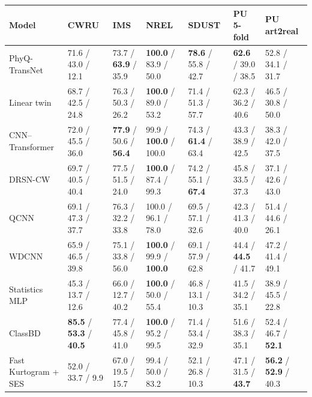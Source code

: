 \begin{tabular}{lllllll}
\toprule
Model & CWRU & IMS & NREL & SDUST & PU 5-fold & PU art2real \\
\midrule
PhyQ-TransNet & 71.6 / 43.0 / 12.1 & 73.7 / \textbf{63.9} / 35.9 & \textbf{100.0} / 83.9 / 50.0 & \textbf{78.6} / 55.8 / 42.7 & \textbf{62.6} / 39.0 / 38.5 & 52.8 / 34.1 / 31.7 \\
Linear twin & 68.7 / 42.5 / 24.8 & 76.3 / 50.3 / 26.2 & \textbf{100.0} / 89.0 / 53.2 & 71.4 / 51.3 / 57.7 & 62.3 / 36.2 / 40.6 & 46.5 / 30.8 / 50.0 \\
CNN--Transformer & 72.0 / 45.5 / 36.0 & \textbf{77.9} / 50.6 / \textbf{56.4} & 99.9 / \textbf{100.0} / 100.0 & 74.3 / \textbf{61.4} / 63.4 & 43.3 / 38.9 / 42.5 & 38.3 / 42.0 / 37.5 \\
DRSN-CW & 69.7 / 40.5 / 40.4 & 77.5 / 51.5 / 24.0 & \textbf{100.0} / 87.4 / 99.3 & 74.2 / 55.1 / \textbf{67.4} & 45.8 / 33.5 / 37.3 & 37.1 / 42.6 / 43.0 \\
QCNN & 69.1 / 47.3 / 37.7 & 76.3 / 32.2 / 33.8 & 100.0 / 96.1 / 78.0 & 69.5 / 57.1 / 32.6 & 42.3 / 41.3 / 40.0 & 51.4 / 44.6 / 26.1 \\
WDCNN & 65.9 / 46.5 / 39.8 & 75.1 / 33.8 / 56.0 & \textbf{100.0} / 99.9 / \textbf{100.0} & 69.1 / 57.9 / 62.8 & 44.4 / \textbf{44.5} / 41.7 & 47.2 / 41.4 / 49.1 \\
Statistics MLP & 45.3 / 13.7 / 12.6 & 66.0 / 12.7 / 40.2 & \textbf{100.0} / 50.0 / 55.4 & 46.8 / 13.1 / 10.3 & 41.5 / 34.2 / 35.1 & 38.9 / 45.5 / 22.8 \\
ClassBD & \textbf{85.5} / \textbf{53.3} / \textbf{40.5} & 77.4 / 45.8 / 41.0 & \textbf{100.0} / 95.2 / 99.5 & 71.4 / 53.4 / 32.9 & 51.6 / 38.3 / 35.1 & 52.4 / 46.7 / \textbf{52.1} \\
Fast Kurtogram + SES & 52.0 / 33.7 / 9.9 & 67.0 / 19.5 / 15.7 & 99.4 / 50.0 / 83.2 & 52.1 / 26.8 / 10.3 & 47.1 / 31.5 / \textbf{43.7} & \textbf{56.2} / \textbf{52.9} / 40.3 \\
\bottomrule
\end{tabular}